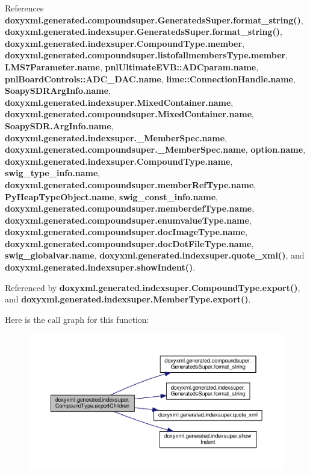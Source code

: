 References {\bf doxyxml.\+generated.\+compoundsuper.\+Generateds\+Super.\+format\+\_\+string()}, {\bf doxyxml.\+generated.\+indexsuper.\+Generateds\+Super.\+format\+\_\+string()}, {\bf doxyxml.\+generated.\+indexsuper.\+Compound\+Type.\+member}, {\bf doxyxml.\+generated.\+compoundsuper.\+listofallmembers\+Type.\+member}, {\bf L\+M\+S7\+Parameter.\+name}, {\bf pnl\+Ultimate\+E\+V\+B\+::\+A\+D\+Cparam.\+name}, {\bf pnl\+Board\+Controls\+::\+A\+D\+C\+\_\+\+D\+A\+C.\+name}, {\bf lime\+::\+Connection\+Handle.\+name}, {\bf Soapy\+S\+D\+R\+Arg\+Info.\+name}, {\bf doxyxml.\+generated.\+indexsuper.\+Mixed\+Container.\+name}, {\bf doxyxml.\+generated.\+compoundsuper.\+Mixed\+Container.\+name}, {\bf Soapy\+S\+D\+R.\+Arg\+Info.\+name}, {\bf doxyxml.\+generated.\+indexsuper.\+\_\+\+Member\+Spec.\+name}, {\bf doxyxml.\+generated.\+compoundsuper.\+\_\+\+Member\+Spec.\+name}, {\bf option.\+name}, {\bf doxyxml.\+generated.\+indexsuper.\+Compound\+Type.\+name}, {\bf swig\+\_\+type\+\_\+info.\+name}, {\bf doxyxml.\+generated.\+compoundsuper.\+member\+Ref\+Type.\+name}, {\bf Py\+Heap\+Type\+Object.\+name}, {\bf swig\+\_\+const\+\_\+info.\+name}, {\bf doxyxml.\+generated.\+compoundsuper.\+memberdef\+Type.\+name}, {\bf doxyxml.\+generated.\+compoundsuper.\+enumvalue\+Type.\+name}, {\bf doxyxml.\+generated.\+compoundsuper.\+doc\+Image\+Type.\+name}, {\bf doxyxml.\+generated.\+compoundsuper.\+doc\+Dot\+File\+Type.\+name}, {\bf swig\+\_\+globalvar.\+name}, {\bf doxyxml.\+generated.\+indexsuper.\+quote\+\_\+xml()}, and {\bf doxyxml.\+generated.\+indexsuper.\+show\+Indent()}.



Referenced by {\bf doxyxml.\+generated.\+indexsuper.\+Compound\+Type.\+export()}, and {\bf doxyxml.\+generated.\+indexsuper.\+Member\+Type.\+export()}.



Here is the call graph for this function\+:
\nopagebreak
\begin{figure}[H]
\begin{center}
\leavevmode
\includegraphics[width=350pt]{d6/db9/classdoxyxml_1_1generated_1_1indexsuper_1_1CompoundType_aebf46d446aebbab2a567f6dce461955a_cgraph}
\end{center}
\end{figure}





